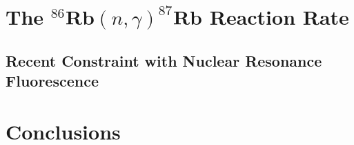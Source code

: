 \section{The $^{86}\mathrm{\textbf{Rb}}(n,\gamma)^{87}\mathrm{\textbf{Rb}}$ Reaction Rate} \label{sec:86Rb_n_g_rate}

\subsection{Recent Constraint with Nuclear Resonance Fluorescence}



\section{Conclusions}

